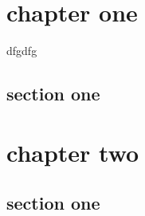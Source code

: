 \documentclass[11pt, openany]{book}
\begin{document}
\tableofcontents
\newpage

\chapter*{chapter one}
dfgdfg
\section{section one}
\newpage  
\chapter{chapter two}
\section{section one} 
\end{document}
